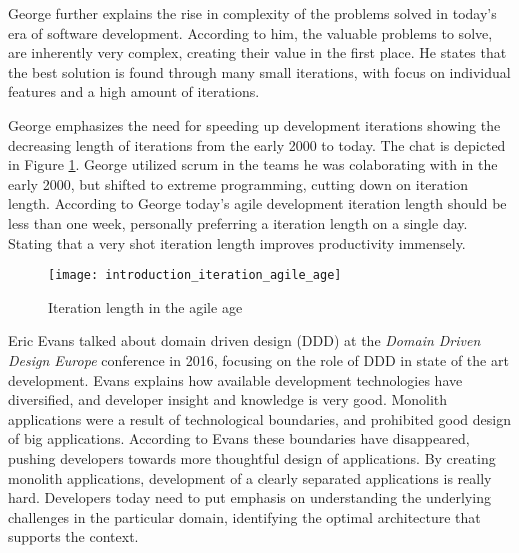 George further explains the rise in complexity of the problems solved in today's era of software development. According to him, the valuable problems to solve, are inherently very complex, creating their value in the first place. He states that the best solution is found through many small iterations, with focus on individual features and a high amount of iterations.

George emphasizes the need for speeding up development iterations showing the decreasing length of iterations from the early 2000 to today. The chat is depicted in Figure \ref{fig:introduction_iteration_agile_age}. 
George utilized scrum in the teams he was colaborating with in the early 2000, but shifted to extreme programming, cutting down on iteration length. According to George today's agile development iteration length should be less than one week, personally preferring a iteration length on a single day. Stating that a very shot iteration length improves productivity immensely.

\begin{figure}[!htb]
  \texttt{[image: introduction\_iteration\_agile\_age]}  
  \caption{Iteration length in the agile age}
  \label{fig:introduction_iteration_agile_age}
\end{figure}




Eric Evans talked about domain driven design (DDD) at the \textit{Domain Driven Design Europe} conference\cite{evans2016tackling} in 2016, focusing on the role of DDD in state of the art development. Evans explains how available development technologies have diversified, and developer insight and knowledge is very good. Monolith applications were a result of technological boundaries, and prohibited good design of big applications. According to Evans these boundaries have disappeared, pushing developers towards more thoughtful design of applications. By creating monolith applications, development of a clearly separated applications is really hard. Developers today need to put emphasis on understanding the underlying challenges in the particular domain, identifying the optimal architecture that supports the context.





